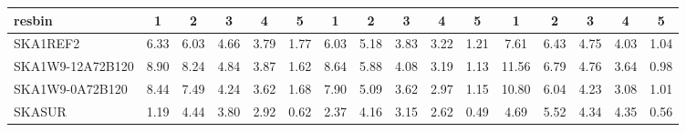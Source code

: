 \begin{table}[!htp]
{{\begin{tabular}{|lccccc||ccccc||ccccc|}
 resbin  &1 & 2 & 3 & 4 & 5 & 1 & 2 & 3 & 4 & 5 & 1 & 2 & 3 & 4 & 5 \tabularnewline \hline
SKA1REF2 & 6.33 \cellcolor{blue!46.00} & 6.03 \cellcolor{red!35.57} & 4.66 \cellcolor{green!52.73} & 3.79 \cellcolor{orange!56.46} & 1.77 \cellcolor{purple!60.00} & 6.03 \cellcolor{blue!42.52} & 5.18 \cellcolor{red!42.91} & 3.83 \cellcolor{green!48.71} & 3.22 \cellcolor{orange!60.00} & 1.21 \cellcolor{purple!60.00} & 7.61 \cellcolor{blue!35.85} & 6.43 \cellcolor{red!48.09} & 4.75 \cellcolor{green!59.21} & 4.03 \cellcolor{orange!49.42} & 1.04 \cellcolor{purple!60.00}\\ \hline 
SKA1W9-12A72B120 & 8.90 \cellcolor{blue!60.00} & 8.24 \cellcolor{red!60.00} & 4.84 \cellcolor{green!60.00} & 3.87 \cellcolor{orange!60.00} & 1.62 \cellcolor{purple!54.52} & 8.64 \cellcolor{blue!60.00} & 5.88 \cellcolor{red!60.00} & 4.08 \cellcolor{green!60.00} & 3.19 \cellcolor{orange!57.90} & 1.13 \cellcolor{purple!55.33} & 11.56 \cellcolor{blue!60.00} & 6.79 \cellcolor{red!60.00} & 4.76 \cellcolor{green!60.00} & 3.64 \cellcolor{orange!36.52} & 0.98 \cellcolor{purple!54.75}\\ \hline 
SKA1W9-0A72B120 & 8.44 \cellcolor{blue!57.49} & 7.49 \cellcolor{red!51.71} & 4.24 \cellcolor{green!35.77} & 3.62 \cellcolor{orange!48.95} & 1.68 \cellcolor{purple!56.71} & 7.90 \cellcolor{blue!55.04} & 5.09 \cellcolor{red!40.71} & 3.62 \cellcolor{green!39.23} & 2.97 \cellcolor{orange!42.50} & 1.15 \cellcolor{purple!56.50} & 10.80 \cellcolor{blue!55.35} & 6.04 \cellcolor{red!35.20} & 4.23 \cellcolor{green!18.00} & 3.08 \cellcolor{orange!18.00} & 1.01 \cellcolor{purple!57.37}\\ \hline 
SKASUR & 1.19 \cellcolor{blue!18.00} & 4.44 \cellcolor{red!18.00} & 3.80 \cellcolor{green!18.00} & 2.92 \cellcolor{orange!18.00} & 0.62 \cellcolor{purple!18.00} & 2.37 \cellcolor{blue!18.00} & 4.16 \cellcolor{red!18.00} & 3.15 \cellcolor{green!18.00} & 2.62 \cellcolor{orange!18.00} & 0.49 \cellcolor{purple!18.00} & 4.69 \cellcolor{blue!18.00} & 5.52 \cellcolor{red!18.00} & 4.34 \cellcolor{green!26.72} & 4.35 \cellcolor{orange!60.00} & 0.56 \cellcolor{purple!18.00}\tabularnewline \hline 
\end{tabular}}\hfil 
{}}
\end{table}
